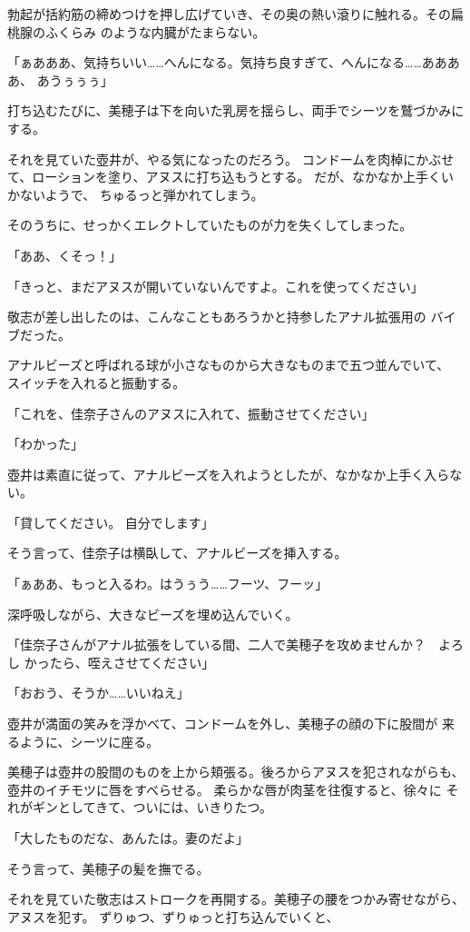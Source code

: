 ﻿\documentclass[
    book,tate,
    line_length=30zw,
    jafontsize=12pt,
    paper=b5j,
    landscape,
    ]{jlreq}
\begin{document}
勃起が括約筋の締めつけを押し広げていき、その奥の熱い滾りに触れる。その扁桃腺のふくらみ
のような内臓がたまらない。

「ぁあああ、気持ちいい……へんになる。気持ち良すぎて、へんになる……ああああ、
あうぅぅぅ」

打ち込むたびに、美穂子は下を向いた乳房を揺らし、両手でシーツを鷲づかみにする。

それを見ていた壺井が、やる気になったのだろう。
コンドームを肉棹にかぶせて、ローションを塗り、アヌスに打ち込もうとする。
だが、なかなか上手くいかないようで、 ちゅるっと弾かれてしまう。

そのうちに、せっかくエレクトしていたものが力を失くしてしまった。

「ああ、くそっ！」

「きっと、まだアヌスが開いていないんですよ。これを使ってください」

敬志が差し出したのは、こんなこともあろうかと持参したアナル拡張用の
バイブだった。

アナルビーズと呼ばれる球が小さなものから大きなものまで五つ並んでいて、
スイッチを入れると振動する。

「これを、佳奈子さんのアヌスに入れて、振動させてください」

「わかった」

壺井は素直に従って、アナルビーズを入れようとしたが、なかなか上手く入らない。

「貸してください。 自分でします」

そう言って、佳奈子は横臥して、アナルビーズを挿入する。

「ぁああ、もっと入るわ。はうぅう……フーツ、フーッ」

深呼吸しながら、大きなビーズを埋め込んでいく。

「佳奈子さんがアナル拡張をしている間、二人で美穂子を攻めませんか？　よろし
かったら、咥えさせてください」

「おおう、そうか……いいねえ」

壺井が満面の笑みを浮かべて、コンドームを外し、美穂子の顔の下に股間が
来るように、シーツに座る。

美穂子は壺井の股間のものを上から頬張る。後ろからアヌスを犯されながらも、
壺井のイチモツに唇をすべらせる。 柔らかな唇が肉茎を往復すると、徐々に
それがギンとしてきて、ついには、いきりたつ。

「大したものだな、あんたは。妻のだよ」

そう言って、美穂子の髪を撫でる。

それを見ていた敬志はストロークを再開する。美穂子の腰をつかみ寄せながら、
アヌスを犯す。 ずりゅつ、ずりゅっと打ち込んでいくと、
\end{document}
